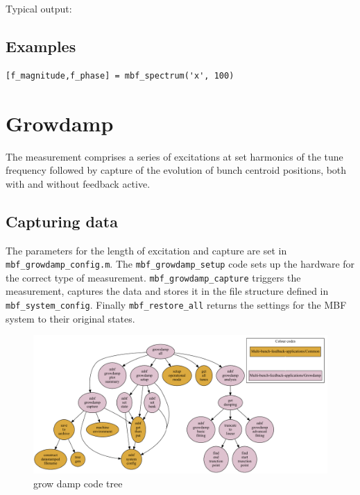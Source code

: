 \documentclass{report}
\begin{document}
Typical output:


\section{Examples}

\begin{verbatim}
[f_magnitude,f_phase] = mbf_spectrum('x', 100)
\end{verbatim}

\chapter{Growdamp}
The measurement comprises a series of excitations at set harmonics of the tune frequency followed by capture of the evolution of bunch centroid positions, both with and without feedback active.
\section{Capturing data}
The parameters for the length of excitation and  capture are set in \verb|mbf_growdamp_config.m|. The \verb|mbf_growdamp_setup| code sets up the hardware for the correct type of measurement. \verb|mbf_growdamp_capture| triggers the measurement, captures the data and stores it in the file structure defined in \verb|mbf_system_config|. Finally \verb|mbf_restore_all| returns the settings for the MBF system to their original states.

\begin{figure}[hbt]
   \centering
        \includegraphics[width=\textwidth]{growdamp_all.pdf}
        \caption{grow damp code tree}
        \label{fig:growdamp_code_tree}
\end{figure}
\end{document}

